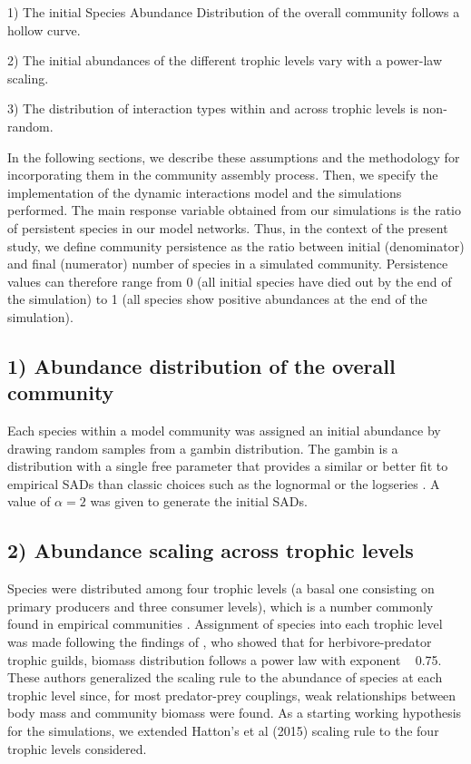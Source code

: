 1) The initial Species Abundance Distribution of the overall community follows a hollow curve.


2) The initial abundances of the different trophic levels vary with a power-law scaling.


3) The distribution of interaction types within and across trophic levels is non-random.


In the following sections, we describe these assumptions and the methodology for incorporating them in the community assembly process. Then, we specify the implementation of the dynamic interactions model and the simulations performed. The main response variable obtained from our simulations is the ratio of persistent species in our model networks. Thus, in the context of the present study, we define community persistence as the ratio between initial (denominator) and final (numerator) number of species in a simulated community. Persistence values can therefore range from 0 (all initial species have died out by the end of the simulation) to 1 (all species show positive abundances at the end of the simulation).

\subsection*{1) Abundance distribution of the overall community}

Each species within a model community was assigned an initial abundance by drawing random samples from a gambin distribution. The gambin is a distribution with a single free parameter that provides a similar or better fit to empirical SADs than classic choices such as the lognormal or the logseries \citep{Matthews2014a}. A value of $\alpha = 2$ was given to generate the initial SADs.

\subsection*{2) Abundance scaling across trophic levels}

Species were distributed among four trophic levels (a basal one consisting on primary producers and three consumer levels), which is a number commonly found in empirical communities \citep{Ulanowicz2014a}. Assignment of species into each trophic level was made following the findings of \cite{Hatton2015}, who showed that for herbivore-predator trophic guilds, biomass distribution follows a power law with exponent ~ 0.75. These authors generalized the scaling rule to the abundance of species at each trophic level since, for most predator-prey couplings, weak relationships between body mass and community biomass were found. As a starting working hypothesis for the simulations, we extended Hatton’s et al (2015) scaling rule to the four trophic levels considered.

